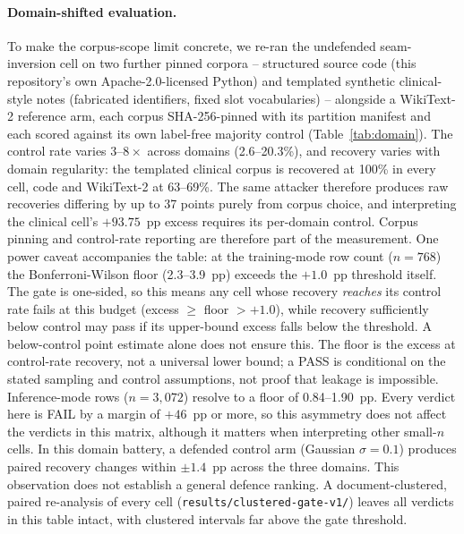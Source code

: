 \documentclass[11pt]{article}
\newcommand{\pp}{pp}
\begin{document}
\paragraph{Domain-shifted evaluation.}
To make the corpus-scope limit concrete, we re-ran the undefended
seam-inversion cell on two further pinned corpora -- structured source
code (this repository's own Apache-2.0-licensed Python) and templated synthetic
clinical-style notes (fabricated identifiers, fixed slot vocabularies) -- alongside a WikiText-2 reference arm, each corpus SHA-256-pinned
with its partition manifest and each scored against its own label-free
majority control (Table~\ref{tab:domain}). The control rate varies
$3$--$8\times$ across domains (2.6--20.3\%), and recovery varies with
domain regularity: the templated clinical corpus is recovered at 100\%
in every cell, code and WikiText-2 at 63--69\%. The same attacker
therefore produces raw recoveries differing by up to 37 points purely
from corpus choice, and interpreting the clinical cell's $+93.75$~\pp{} excess requires its
per-domain control. Corpus pinning and control-rate reporting are therefore
part of the measurement. One power
caveat accompanies the table: at the training-mode row count
($n{=}768$) the Bonferroni-Wilson floor (2.3--3.9~\pp) exceeds the
$+1.0$~\pp{} threshold itself. The gate is one-sided, so this means any
cell whose recovery \emph{reaches} its control rate fails at this budget
(excess $\ge$ floor $> +1.0$), while recovery sufficiently below control may pass if its upper-bound excess falls below the threshold. A below-control point estimate alone does not ensure this. The floor is the excess at control-rate recovery, not a universal lower bound; a PASS is conditional on the stated sampling and control assumptions, not proof that leakage is impossible. Inference-mode rows ($n{=}3{,}072$) resolve to
a floor of 0.84--1.90~\pp. Every verdict here is FAIL by a
margin of $+46$~\pp{} or more, so this asymmetry does not affect the verdicts in this
matrix, although it matters when interpreting other small-$n$ cells.
In this domain battery, a defended control arm (Gaussian $\sigma{=}0.1$)
produces paired recovery changes within $\pm 1.4$~\pp{} across the three domains. This observation does not establish a general defence ranking. A
document-clustered, paired re-analysis of every cell
(\texttt{results/clustered-gate-v1/}) leaves all verdicts in this table
intact, with clustered intervals far above the gate threshold.
\end{document}
